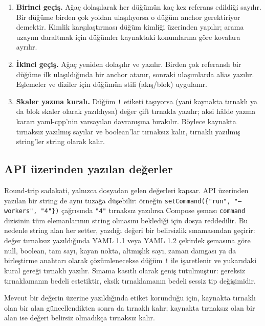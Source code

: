 \documentclass[conference]{IEEEtran}
\begin{document}
\begin{enumerate}
  \item \textbf{Birinci geçiş.} Ağaç dolaşılarak her düğümün kaç kez
    referans edildiği sayılır. Bir düğüme birden çok yoldan ulaşılıyorsa o
    düğüm anchor gerektiriyor demektir. Kimlik karşılaştırması düğüm
    kimliği üzerinden yapılır; arama uzayını daraltmak için düğümler
    kaynaktaki konumlarına göre kovalara ayrılır.
  \item \textbf{İkinci geçiş.} Ağaç yeniden dolaşılır ve yazılır. Birden
    çok referanslı bir düğüme ilk ulaşıldığında bir anchor atanır, sonraki
    ulaşımlarda alias yazılır. Eşlemeler ve diziler için düğümün stili
    (akış/blok) uygulanır.
  \item \textbf{Skaler yazma kuralı.} Düğüm \texttt{!} etiketi taşıyorsa
    (yani kaynakta tırnaklı ya da blok skaler olarak yazıldıysa) değer çift
    tırnakla yazılır; aksi
    hâlde yazma kararı yaml-cpp'nin varsayılan davranışına bırakılır.
    Böylece kaynakta tırnaksız yazılmış sayılar ve boolean'lar tırnaksız
    kalır, tırnaklı yazılmış string'ler string olarak kalır.
\end{enumerate}

\subsection{API üzerinden yazılan değerler}
Round-trip sadakati, yalnızca dosyadan gelen değerleri kapsar. API
üzerinden yazılan bir string de aynı tuzağa düşebilir: örneğin
\texttt{setCommand(\{"run", "--workers", "4"\})} çağrısında
\texttt{"4"} tırnaksız yazılırsa Compose şeması \texttt{command} dizisinin
tüm elemanlarının string olmasını beklediği için dosya reddedilir. Bu
nedenle string alan her setter, yazdığı değeri bir belirsizlik sınamasından
geçirir: değer tırnaksız yazıldığında YAML 1.1 veya YAML 1.2 çekirdek
şemasına göre null, boolean, tam sayı, kayan nokta, altmışlık sayı, zaman
damgası ya da birleştirme anahtarı olarak çözümlenecekse düğüm \texttt{!}
ile işaretlenir ve yukarıdaki kural gereği tırnaklı yazılır. Sınama
kasıtlı olarak geniş tutulmuştur: gereksiz tırnaklamanın bedeli
estetiktir, eksik tırnaklamanın bedeli sessiz tip değişimidir.

Mevcut bir değerin üzerine yazıldığında etiket korunduğu için, kaynakta
tırnaklı olan bir alan güncellendikten sonra da tırnaklı kalır; kaynakta
tırnaksız olan bir alan ise değeri belirsiz olmadıkça tırnaksız kalır.
\end{document}
